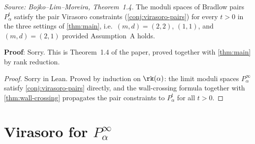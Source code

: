 \begin{theorem}[VirasoroBradlowPairs]
  \label{thm:virasorobradlowpairs}
  \textit{Source: Bojko--Lim--Moreira, Theorem~1.4.}
  The moduli spaces of Bradlow pairs \(P_\alpha^t\) satisfy the pair Virasoro
  constraints (\cref{conj:virasoro-pairs}) for every \(t > 0\) in the three settings
  of \cref{thm:main}, i.e.\ \((m,d) = (2,2)\), \((1,1)\), and \((m,d) = (2,1)\)
  provided Assumption~A holds.

  \textbf{Proof}: Sorry. This is Theorem~1.4 of the paper, proved together with
  \cref{thm:main} by rank reduction.
\end{theorem}

\begin{proof}
  Sorry in Lean. Proved by induction on \(\rk(\alpha)\): the limit moduli spaces
  \(P_\alpha^\infty\) satisfy \cref{conj:virasoro-pairs} directly, and the
  wall-crossing formula together with \cref{thm:wall-crossing} propagates the pair
  constraints to \(P_\alpha^t\) for all \(t > 0\).
\end{proof}

\section{Virasoro for $P_\alpha^\infty$}


